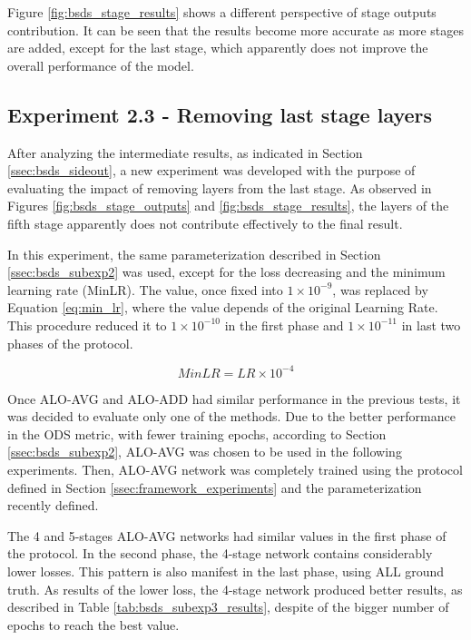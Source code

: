 Figure \ref{fig:bsds_stage_results} shows a different perspective of stage outputs contribution.
It can be seen that the results become more accurate as more stages are added, except for the last stage, which apparently does not improve the overall performance of the model.

\subsection{Experiment 2.3 - Removing last stage layers}
\label{ssec:bsds_subexp3}

After analyzing the intermediate results, as indicated in Section \ref{ssec:bsds_sideout}, a new experiment was developed with the purpose of evaluating the impact of removing layers from the last stage.
As observed in Figures \ref{fig:bsds_stage_outputs} and \ref{fig:bsds_stage_results}, the layers of the fifth stage apparently does not contribute effectively to the final result.

In this experiment, the same parameterization described in Section \ref{ssec:bsds_subexp2} was used, except for the loss decreasing and the minimum learning rate (MinLR).
The value, once fixed into $1 \times 10^{-9}$, was replaced by Equation \ref{eq:min_lr}, where the value depends of the original Learning Rate.
This procedure reduced it to $1 \times 10^{-10}$ in the first phase and $1 \times 10^{-11}$ in last two phases of the protocol.

\begin{equation}
  MinLR = LR \times 10^{-4}
  \label{eq:min_lr}
\end{equation}

Once ALO-AVG and ALO-ADD had similar performance in the previous tests, it was decided to evaluate only one of the methods.
Due to the better performance in the ODS metric, with fewer training epochs, according to Section \ref{ssec:bsds_subexp2}, ALO-AVG was chosen to be used in the following experiments.
Then, ALO-AVG network was completely trained using the protocol defined in Section \ref{ssec:framework_experiments} and the parameterization recently defined.

The 4 and 5-stages ALO-AVG networks had similar values in the first phase of the protocol.
In the second phase, the 4-stage network contains considerably lower losses.
This pattern is also manifest in the last phase, using ALL ground truth.
As results of the lower loss, the 4-stage network produced better results, as described in Table \ref{tab:bsds_subexp3_results}, despite of the bigger number of epochs to reach the best value.

